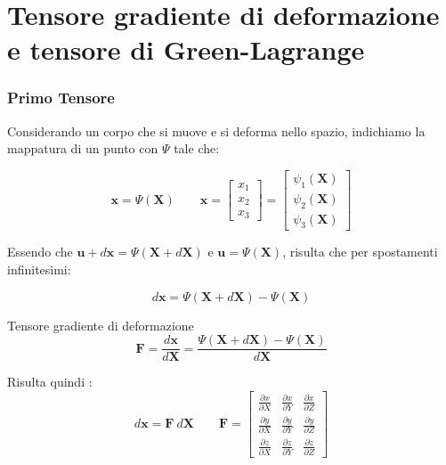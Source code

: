 \section{Tensore gradiente di deformazione e tensore di Green-Lagrange}
\subsubsection*{Primo Tensore}
Considerando un corpo che si muove e si deforma nello spazio, indichiamo la mappatura di un punto con $\Psi$ tale che:

\begin{equation*}
\mathbf{x} =  \Psi(\mathbf{X}) 
\quad \quad 
\mathbf{x} = 
\begin{bmatrix}
x_1 \\
x_2 \\
x_3
\end{bmatrix}
= 
\begin{bmatrix}
\psi_1(\mathbf{X}) \\
\psi_2(\mathbf{X}) \\
\psi_3(\mathbf{X})
\end{bmatrix}
\end{equation*}

Essendo che $\mathbf{u} + d\mathbf{x} = \Psi(\mathbf{X} + d\mathbf{X})$ e $\mathbf{u} = \Psi(\mathbf{X})$, risulta che per spostamenti infinitesimi:

\begin{equation*}
d\mathbf{x} = \Psi(\mathbf{X} + d\mathbf{X}) - \Psi(\mathbf{X})
\end{equation*}

\begin{definizioneBox}
Tensore gradiente di deformazione 
\begin{equation*}
\boldsymbol{F} = \frac{d\mathbf{x}}{d\mathbf{X}} = \frac{\Psi(\mathbf{X} + d\mathbf{X}) - \Psi(\mathbf{X})}{d\mathbf{X}}
\end{equation*}
\end{definizioneBox}

Risulta quindi :
\begin{equation*}
d\mathbf{x} = \boldsymbol{F}\ d\mathbf{X} 
\quad \quad  
\boldsymbol{F} = 
\begin{bmatrix}
\frac{\partial x}{\partial X} & \frac{\partial x}{\partial Y} & \frac{\partial x}{\partial Z} \\
\frac{\partial y}{\partial X} & \frac{\partial y}{\partial Y} & \frac{\partial y}{\partial Z} \\
\frac{\partial z}{\partial X} & \frac{\partial z}{\partial Y} & \frac{\partial z}{\partial Z}
\end{bmatrix}
\end{equation*}

